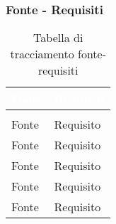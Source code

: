 \subsubsection{Fonte - Requisiti}
\renewcommand{\arraystretch}{1.5}
\begin{center}
\begin{longtable}{C{6cm} C{6cm}}
		\textcolor{white}{\textbf{Fonte}} & 
		\textcolor{white}{\textbf{Requisiti}}\\
		\endfirsthead
	    \\
	    \endfoot
	    \caption{Tabella di tracciamento fonte-requisiti}
	    \endlastfoot

Fonte & Requisito \\
Fonte & Requisito \\
Fonte & Requisito \\
Fonte & Requisito \\
Fonte & Requisito \\
\end{longtable}
\end{center}